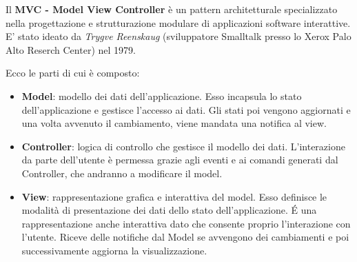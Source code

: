 			Il \textbf{MVC - Model View Controller} è un pattern architetturale specializzato nella progettazione e strutturazione modulare di applicazioni software interattive.
			E' stato ideato da \textit{Trygve Reenskaug} (sviluppatore Smalltalk presso lo Xerox Palo Alto Reserch Center) nel 1979.
			
			Ecco le parti di cui è composto: 
			\begin{itemize}
				\item \textbf{Model}: modello dei dati dell'applicazione. Esso incapsula lo stato dell'applicazione e gestisce l'accesso ai dati. Gli stati poi vengono aggiornati e una volta avvenuto il cambiamento, viene mandata una notifica al view.

				\item \textbf{Controller}: logica di controllo che gestisce il modello dei dati. L'interazione da parte dell'utente è permessa grazie agli eventi e ai comandi generati dal Controller, che andranno a modificare il model.
			
				\item \textbf{View}: rappresentazione grafica e interattiva del model. Esso definisce le modalità di presentazione dei dati dello stato dell'applicazione. \'E una rappresentazione anche interattiva dato che consente proprio l'interazione con l'utente. 
				Riceve delle notifiche dal Model se avvengono dei cambiamenti e poi successivamente aggiorna la visualizzazione. 
			\end{itemize}
			
			\begin{center}
				\label{img:MVCClass}
			\end{center}
			
